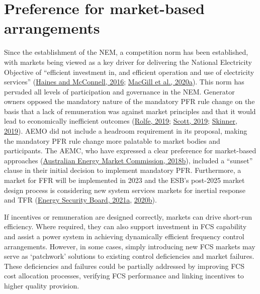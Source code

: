 \documentclass[12pt,a4paper,]{report}
\begin{document}
\hypertarget{preference-for-market-based-arrangements}{%
\section{Preference for market-based
arrangements}\label{preference-for-market-based-arrangements}}

Since the establishment of the NEM, a competition norm has been
established, with markets being viewed as a key driver for delivering
the National Electricity Objective of ``efficient investment in, and
efficient operation and use of electricity services''
(\protect\hyperlink{ref-hainesEnvironmentalNormsElectricity2016}{Haines
and McConnell, 2016};
\protect\hyperlink{ref-macgillElectricityMarketNorms2020}{MacGill et
al., 2020a}). This norm has pervaded all levels of participation and
governance in the NEM. Generator owners opposed the mandatory nature of
the mandatory PFR rule change on the basis that a lack of remuneration
was against market principles and that it would lead to economically
inefficient outcomes
(\protect\hyperlink{ref-rolfeMandatoryPrimaryFrequency2019}{Rolfe,
2019}; \protect\hyperlink{ref-scottMandatoryPrimaryFrequency2019}{Scott,
2019};
\protect\hyperlink{ref-skinnerMandatoryPrimaryFrequency2019}{Skinner,
2019}). AEMO did not include a headroom requirement in its proposal,
making the mandatory PFR rule change more palatable to market bodies and
participants. The AEMC, who have expressed a clear preference for
market-based approaches
(\protect\hyperlink{ref-australianenergymarketcommissionFrequencyControlFrameworks2018}{Australian
Energy Market Commission, 2018b}), included a ``sunset'' clause in their
initial decision to implement mandatory PFR. Furthermore, a market for
FFR will be implemented in 2023 and the ESB's post-2025 market design
process is considering new system services markets for inertial response
and TFR
(\protect\hyperlink{ref-energysecurityboardPost2025Market2021}{Energy
Security Board, 2021a},
\protect\hyperlink{ref-energysecurityboardPost2025Market2020}{2020b}).

If incentives or remuneration are designed correctly, markets can drive
short-run efficiency. Where required, they can also support investment
in FCS capability and assist a power system in achieving dynamically
efficient frequency control arrangements. However, in some cases, simply
introducing new FCS markets may serve as `patchwork' solutions to
existing control deficiencies and market failures. These deficiencies
and failures could be partially addressed by improving FCS cost
allocation processes, verifying FCS performance and linking incentives
to higher quality provision.
\end{document}
